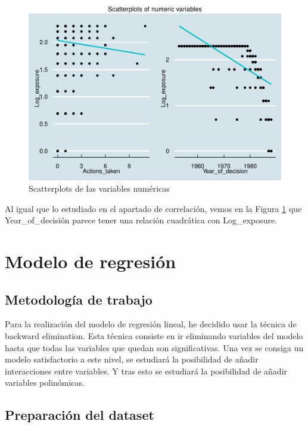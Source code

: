 \documentclass[
]{article}
\begin{document}
\begin{figure}

{\centering \includegraphics[width=0.75\linewidth]{anacalt-regresion_files/figure-latex/grid_sca-1} 

}

\caption{Scatterplots de las variables numéricas}\label{fig:grid_sca}
\end{figure}

Al igual que lo estudiado en el apartado de correlación, vemos en la
Figura \ref{fig:grid_sca} que Year\_of\_decisión parece tener una
relación cuadrática con Log\_exposure.

\hypertarget{modelo-de-regresiuxf3n}{%
\section{Modelo de regresión}\label{modelo-de-regresiuxf3n}}

\hypertarget{metodologuxeda-de-trabajo}{%
\subsection{Metodología de trabajo}\label{metodologuxeda-de-trabajo}}

Para la realización del modelo de regresión lineal, he decidido usar la
técnica de backward elimination. Esta técnica consiste en ir eliminando
variables del modelo hasta que todas las variables que quedan son
significativas. Una vez se consiga un modelo satisfactorio a este nivel,
se estudiará la posibilidad de añadir interacciones entre variables. Y
tras esto se estudiará la posibilidad de añadir variables polinómicas.

\hypertarget{preparaciuxf3n-del-dataset}{%
\subsection{Preparación del dataset}\label{preparaciuxf3n-del-dataset}}
\end{document}
